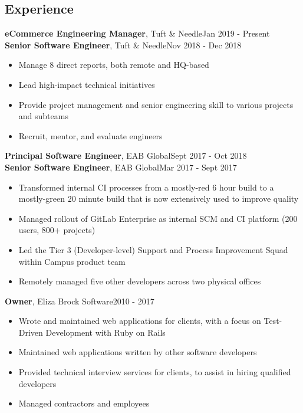 \documentclass[line, margin, 10pt]{res}
\begin{document}
\renewcommand{\namefont}{ \LARGE \bf }

\address{eliza@elizamarcum.com}
\address{elizamarcum.com}

\begin{resume}
\section{Experience}


{\bf eCommerce Engineering Manager}, Tuft \& Needle\hfill Jan 2019 - Present\\
{\bf Senior Software Engineer}, Tuft \& Needle\hfill Nov 2018 - Dec 2018
\begin{itemize} \itemsep -2pt  %
  \item Manage 8 direct reports, both remote and HQ-based
  \item Lead high-impact technical initiatives
  \item Provide project management and senior engineering skill to various projects and subteams
  \item Recruit, mentor, and evaluate engineers
\end{itemize}

{\bf Principal Software Engineer}, EAB Global\hfill Sept 2017 - Oct 2018\\
{\bf Senior Software Engineer}, EAB Global\hfill Mar 2017 - Sept 2017
\begin{itemize} \itemsep -2pt  %
  \item Transformed internal CI processes from a mostly-red 6 hour build to a mostly-green 20 minute build that is now extensively used to improve quality
  \item Managed rollout of GitLab Enterprise as internal SCM and CI platform (200 users, 800+ projects)
  \item Led the Tier 3 (Developer-level) Support and Process Improvement Squad within Campus product team
  \item Remotely managed five other developers across two physical offices
\end{itemize}

{\bf Owner}, Eliza Brock Software\hfill 2010 - 2017
\begin{itemize} \itemsep -2pt  %
  \item Wrote and maintained web applications for clients, with a focus on Test-Driven \mbox{Development} with Ruby on Rails
  \item Maintained web applications written by other software developers
  \item Provided technical interview services for clients, to assist in hiring qualified developers
  \item Managed contractors and employees
\end{itemize}


\end{resume}
\end{document}
